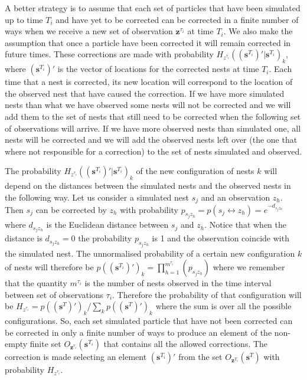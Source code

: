 \documentclass[11pt,a4paper]{article}
\renewcommand{\vec}[1]{\mathbf{#1}}
\begin{document}
{A better strategy is to assume that each set of particles that have been simulated up to time $T_i$ and have yet to be corrected can be corrected in a finite number of ways when we receive a new set of observation $\vec{z}^{\tau_i}$ at time $T_i$. We also make the assumption that once a particle have been corrected it will remain corrected in future times. These corrections are made with probability $H_{z^{\tau_i}}((\vec{s}^{T_i})' | \vec{s}^{T_i})_k$, where $(\vec{s}^{T_i})'$ is the vector of locations for the corrected nests at time $T_i$. Each time that a nest is corrected, its new location will correspond to the location of the observed nest that have caused the correction. If we have more simulated nests than what we have observed some nests will not be corrected and we will add them to the set of nests that still need to be corrected when the following set of observations will arrive. If we have more observed nests than simulated one, all nests will be corrected and we will add the observed nests left over (the one that where not responsible for a correction) to the set of nests simulated and observed.

The probability $H_{z^{\tau_i}}((\vec{s}^{T_i})' | \vec{s}^{T_i})_k$ of the new configuration of nests $k$ will depend on the distances between the simulated nests and the observed nests in the following way. Let us consider a simulated nest $s_j$ and an observation $z_h$. Then $s_j$ can be corrected by $z_h$ with probability $p_{s_j z_h} = p(s_j \leftrightarrow z_h) = e^{-d_{s_j z_h}}$ where $d_{s_j z_h}$ is the Euclidean distance between $s_j$ and $z_h$. Notice that when the distance is $d_{s_j z_h} = 0$ the probability $p_{s_j z_h}$ is 1 and the observation coincide with the simulated nest. The unnormalised probability of a certain new configuration $k$ of nests will therefore be $p((\vec{s}^{T_i})')_k = \prod_{h = 1}^{m^{\tau_i}} (p_{s_j z_h})$ where we remember that the quantity $m^{\tau_i}$ is the number of nests observed in the time interval between set of observations $\tau_i$. Therefore the probability of that configuration will be $H_{z^{\tau_i}} = p((\vec{s}^T)')_k / \sum_k p((\vec{s}^T)')_k $ where the sum is over all the possible configurations. So, each set simulated particle that have not been corrected can be corrected in only a finite number of ways to produce an element of the non-empty finite set $O_{\vec{z}^{\tau_i}} (\vec{s}^{T_i})$ that contains all the allowed corrections. The correction is made selecting an element $(\vec{s}^{T_i})'$ from the set $O_{\vec{z}^{T_i}} (\vec{s}^T)$ with probability $H_{z^{\tau_i}}$.

}
\end{document}
